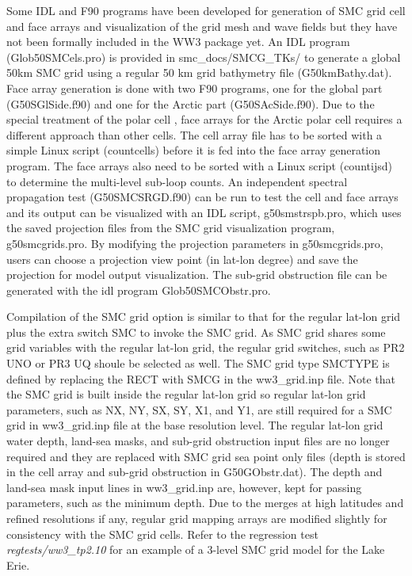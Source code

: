 Some IDL and F90 programs have been developed for generation of SMC grid cell
and face arrays and visualization of the grid mesh and wave fields but they
have not been formally included in the WW3 package yet. An IDL program 
(Glob50SMCels.pro) is provided in smc\_docs/SMCG\_TKs/ to generate a global 
50km SMC grid using a regular 50 km grid bathymetry file (G50kmBathy.dat). 
Face array generation is done with two F90 programs, one for the global part 
(G50SGlSide.f90) and one for the Arctic part (G50SAcSide.f90). Due to the 
special treatment of the polar cell \citep{art:Li12}, face arrays for the 
Arctic polar cell requires a different approach than other cells. The cell 
array file has to be sorted with a simple Linux script (countcells) before it 
is fed into the face array generation program.  The face arrays also need to be 
sorted with a Linux script (countijsd) to determine the multi-level sub-loop 
counts.  An independent spectral propagation test (G50SMCSRGD.f90) can be run 
to test the cell and face arrays and its output can be visualized with an IDL 
script, g50smstrspb.pro, which uses the saved projection files from the SMC 
grid visualization program, g50smcgrids.pro.  By modifying the projection 
parameters in g50smcgrids.pro, users can choose a projection view point (in 
lat-lon degree) and save the projection for model output visualization.  The 
sub-grid obstruction file can be generated with the idl program 
Glob50SMCObstr.pro.

Compilation of the SMC grid option is similar to that for the regular
lat-lon grid plus the extra switch {\code SMC} to invoke the SMC grid.  As SMC
grid shares some grid variables with the regular lat-lon grid, the regular grid
switches, such as {\code PR2 UNO} or {\code PR3 UQ} shoule be selected as well. 
The SMC grid type {\code SMCTYPE} is defined by replacing the {\code RECT} with
{\code SMCG} in the ww3\_grid.inp file.  Note that the SMC grid is built inside
the regular lat-lon grid so regular lat-lon grid parameters, such as NX, NY, 
SX, SY, X1, and Y1, are still required for a SMC grid in ww3\_grid.inp file at 
the base resolution level. The regular lat-lon grid water depth, land-sea 
masks, and sub-grid obstruction input files are no longer required and they are 
replaced with SMC grid sea point only files (depth is stored in the cell array 
and sub-grid obstruction in G50GObstr.dat).  The depth and land-sea mask input 
lines in ww3\_grid.inp are, however, kept for passing parameters, such as the 
minimum depth.  Due to the merges at high latitudes and refined resolutions if 
any, regular grid mapping arrays are modified slightly for consistency with the 
SMC grid cells.  Refer to the regression test \emph{regtests/ww3\_tp2.10}
for an example of a 3-level SMC grid model for the Lake Erie.

